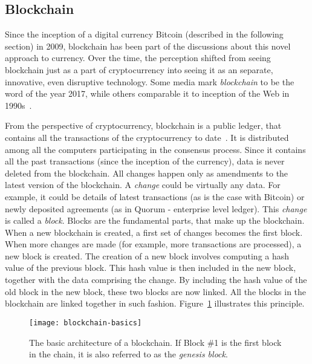 \subsection{Blockchain}
% 
Since the inception of a digital currency Bitcoin (described in the following section) in 2009, blockchain has been part of the discussions about this novel approach to currency. Over the time, the perception shifted from seeing blockchain just as a part of cryptocurrency into seeing it as an separate, innovative, even disruptive technology. Some media mark \textit{blockchain} to be the word of the year 2017\footnotemark, while others comparable it to inception of the Web in 1990s~\cite[p. 14]{Swan2015BlockchainEconomy}.
% 

From the perspective of cryptocurrency, blockchain is a public ledger, that contains all the transactions of the cryptocurrency to date~\cite{Swan2015BlockchainEconomy}. It is distributed among all the computers participating in the consensus process. Since it contains all the past transactions (since the inception of the currency), data is never deleted from the blockchain. All changes happen only as amendments to the latest version of the blockchain. A \textit{change} could be virtually any data. For example, it could be details of latest transactions (as is the case with Bitcoin) or newly deposited agreements (as in Quorum - enterprise level ledger\footnotemark). This \textit{change} is called a \textit{block}. Blocks are the fundamental parts, that make up the blockchain. When a new blockchain is created, a first set of changes becomes the first block.
% 
% 
When more changes are made (for example, more transactions are processed), a new block is created. The creation of a new block involves computing a hash value of the previous block. This hash value is then included in the new block, together with the data comprising the change. By including the hash value of the old block in the new block, these two blocks are now linked. All the blocks in the blockchain are linked together in such fashion. Figure~\ref{fig:blockch-basics} illustrates this principle. 
% 
\begin{figure}[ht]
    \centering
    \texttt{[image: blockchain-basics]}
    \caption{The basic architecture of a blockchain. If Block \#1 is the first block in the chain, it is also referred to as the \textit{genesis block}.}
    \label{fig:blockch-basics}
\end{figure}

